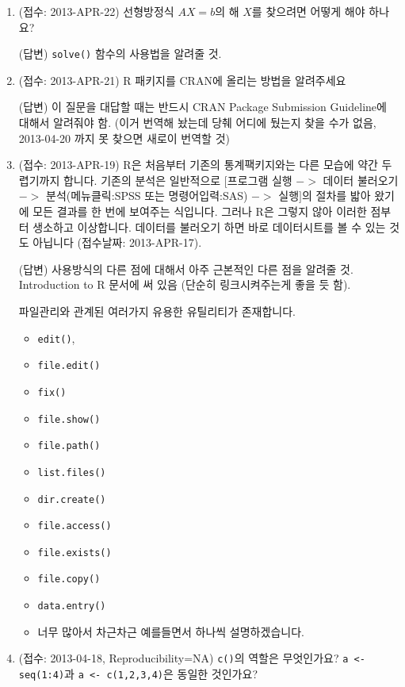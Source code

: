 \documentclass{article}
\begin{document}
\begin{enumerate}
	\item (접수: 2013-APR-22) 선형방정식 $AX=b$의 해 $X$를 찾으려면 어떻게 해야 하나요? 
	
	\textsf{(답변)} \texttt{solve()} 함수의 사용법을 알려줄 것.
	
	\item (접수: 2013-APR-21) R 패키지를 CRAN에 올리는 방법을 알려주세요 
	
	\textsf{(답변)} 이 질문을 대답할 때는 반드시 CRAN Package Submission Guideline에 대해서 알려줘야 함.  (이거 번역해 놨는데 당췌 어디에 뒀는지 찾을 수가 없음, 2013-04-20 까지 못 찾으면 새로이 번역할 것)
	
	\item (접수: 2013-APR-19) R은 처음부터 기존의 통계팩키지와는 다른 모습에 약간 두렵기까지 합니다.  기존의 분석은 일반적으로 $[$프로그램 실행 $->$ 데이터 불러오기 $->$ 분석(메뉴클릭:SPSS 또는 명령어입력:SAS) $->$ 실행$]$의 절차를 밟아 왔기에 모든 결과를 한 번에 보여주는 식입니다. 그러나 R은 그렇지 않아 이러한 점부터 생소하고 이상합니다.  데이터를 불러오기 하면 바로 데이터시트를 볼 수 있는 것도 아닙니다 (접수날짜: 2013-APR-17).

	\textsf{(답변)} 사용방식의 다른 점에 대해서 아주 근본적인 다른 점을 알려줄 것.  Introduction to R 문서에 써 있음 (단순히 링크시켜주는게 좋을 듯 함). 
	
	파일관리와 관계된 여러가지 유용한 유틸리티가 존재합니다. 
	\begin{itemize}
		\item \texttt{edit()},
		\item \texttt{file.edit()}
		\item \texttt{fix()}
		\item \texttt{file.show()}
		\item \texttt{file.path()}
		\item \texttt{list.files()}
		\item \texttt{dir.create()}
		\item \texttt{file.access()}
		\item \texttt{file.exists()}
		\item \texttt{file.copy()}
		\item \texttt{data.entry()}
		\item 너무 많아서 차근차근 예를들면서 하나씩 설명하겠습니다. 
	\end{itemize}
	
	\item (접수: 2013-04-18, Reproducibility=NA) \texttt{c()}의 역할은 무엇인가요? \texttt{a <- seq(1:4)}과 \texttt{a <- c(1,2,3,4)}은 동일한 것인가요?
	

\end{enumerate}
\end{document}
